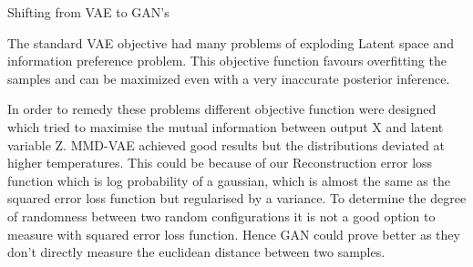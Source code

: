 \documentclass[12pt,a4paper]{article}
\begin{document}

\vspace{\baselineskip}
Shifting from VAE to GAN’s\par

The standard VAE objective had many problems of exploding Latent space and information preference problem. This objective function favours overfitting the samples and can be maximized even with a very inaccurate posterior inference. \par
In order to remedy these problems different objective function were designed which tried to maximise the mutual information between output X and latent variable Z. MMD-VAE achieved good results but the distributions deviated at higher temperatures. This could be because of our Reconstruction error loss function which is log probability of a gaussian, which is almost the same as the squared error loss function but regularised by a variance. To determine the degree of randomness between two random configurations it is not a good option to measure with squared error loss function. Hence GAN could prove better as they don’t directly measure the euclidean distance between two samples.




\end{document}
